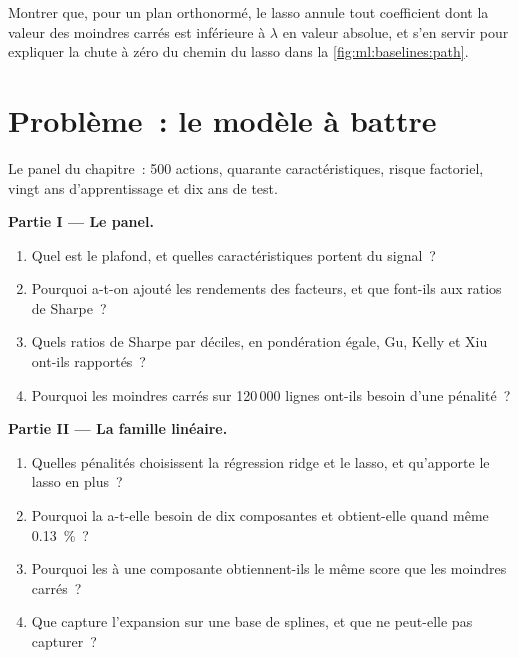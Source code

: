 \begin{exercise}[$\star\star\star$]\label{exo:ml:linear-and-regularised-baselines:8}
Montrer que, pour un plan orthonormé, le lasso annule tout coefficient dont la valeur des moindres carrés est inférieure
à $\lambda$ en valeur absolue, et s'en servir pour expliquer la chute à zéro du chemin du lasso dans la \cref{fig:ml:baselines:path}.
\end{exercise}

\section{Problème~: le modèle à battre}

\begin{problem}\label{pb:ml:linear-and-regularised-baselines:1}
Le panel du chapitre~: 500 actions, quarante caractéristiques, risque factoriel, vingt ans d'apprentissage et dix ans de test.

\medskip\noindent\textbf{Partie I --- Le panel.}
\begin{enumerate}
\item Quel est le plafond, et quelles caractéristiques portent du signal~?
\item Pourquoi a-t-on ajouté les rendements des facteurs, et que font-ils aux ratios de Sharpe~?
\item Quels ratios de Sharpe par déciles, en pondération égale, Gu, Kelly et Xiu ont-ils rapportés~?
\item Pourquoi les moindres carrés sur 120\,000 lignes ont-ils besoin d'une pénalité~?
\end{enumerate}

\medskip\noindent\textbf{Partie II --- La famille linéaire.}
\begin{enumerate}[resume]
\item Quelles pénalités choisissent la régression ridge et le lasso, et qu'apporte le lasso en plus~?
\item Pourquoi la  a-t-elle besoin de dix composantes et obtient-elle quand même 0.13~\%~?
\item Pourquoi les  à une composante obtiennent-ils le même score que les moindres carrés~?
\item Que capture l'expansion sur une base de splines, et que ne peut-elle pas capturer~?
\end{enumerate}


\end{problem}
